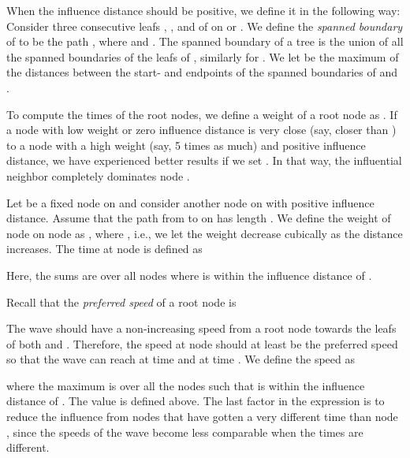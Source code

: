 \documentclass[3p]{elsarticle}
\begin{document}
When the influence distance should be positive, we define it in the following way:
Consider three consecutive leafs , , and  of 
on  or . We define the \emph{spanned boundary} of 
to be the path , where 
and .
The spanned boundary of a tree 
is the union of all the spanned boundaries of the leafs of , similarly for .
We let  be the maximum of the distances between the start- and endpoints of the
spanned boundaries of  and .

To compute the times of the root nodes,
we define a weight of a root node  as
.
If a node  with low weight or zero influence distance is very close (say, closer than )
to a node  with a high weight
(say, 5 times as much) and positive influence distance, we have experienced better results
if we set . In that way, the influential neighbor  completely dominates node .

Let  be a fixed node on 
and consider another node  on  with positive influence distance.
Assume that the path
from  to  on  has length .
We define the
weight of node  on node  as
, where ,
i.e., we let the weight decrease cubically as the distance increases.
The time at node  is defined as

Here, the sums are over all nodes  where  is within the influence distance of .

Recall that the \emph{preferred speed} of a root node  is

The wave should have a non-increasing speed from a root node 
towards the leafs of both  and .
Therefore, the speed at node  should at least be the preferred speed
so that the wave can reach  at time  and  at time .
We define the speed as

where the maximum is over all the nodes  such that  is within the influence distance of .
The value  is defined above.
The last factor in the expression is to reduce the influence from nodes that have gotten a
very different time than node , since the speeds of the wave become less comparable
when the times are different.
\end{document}
